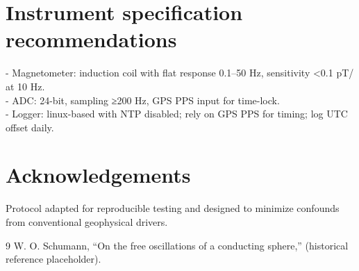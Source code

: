 \documentclass[11pt]{article}
\begin{document}
\section*{Instrument specification recommendations}
- Magnetometer: induction coil with flat response 0.1--50 Hz, sensitivity <0.1 pT/ at 10 Hz.\\
- ADC: 24-bit, sampling ≥200 Hz, GPS PPS input for time-lock.\\
- Logger: linux-based with NTP disabled; rely on GPS PPS for timing; log UTC offset daily.

\section*{Acknowledgements}
Protocol adapted for reproducible testing and designed to minimize confounds from conventional geophysical drivers.


\begin{thebibliography}{9}
 W. O. Schumann, ``On the free oscillations of a conducting sphere,'' (historical reference placeholder).
\end{thebibliography}
\end{document}
